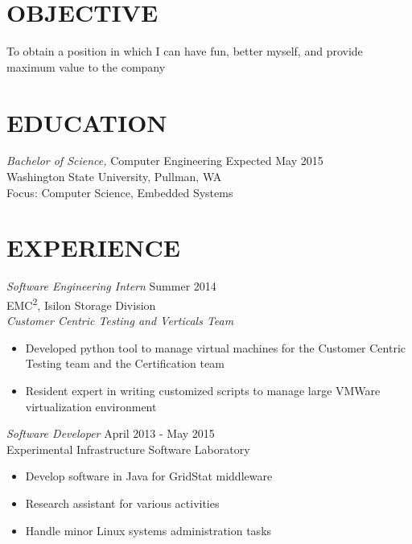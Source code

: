 \documentclass[line, margin]{res}
\begin{document}
\address{1455 NE Brandi Way Apt H203, Pullman, WA 99163}
\address{253-508-2725}

 
\begin{resume}
 
\section{OBJECTIVE}  To obtain a position in which I can have fun, better
				myself, and provide maximum value to the company 
 
\section{EDUCATION} {\sl Bachelor of Science,} Computer Engineering \hfill Expected May 2015 \\
                Washington State University, Pullman, WA\\
                Focus: Computer Science, Embedded Systems
 
\section{EXPERIENCE} {\sl Software Engineering Intern} \hfill Summer 2014 \\
                EMC\textsuperscript{2}, Isilon Storage Division\\
                {\sl Customer Centric Testing and Verticals Team}
                 \begin{itemize}  \itemsep -2pt %
                 \item Developed python tool to manage virtual machines for the
                 Customer Centric Testing team and the Certification team
                \item Resident expert in writing customized scripts to manage large VMWare 
                virtualization environment
                \end{itemize}

                {\sl Software Developer} \hfill       April 2013 - May 2015 \\
                Experimental Infrastructure Software Laboratory
            \begin{itemize} \itemsep -2pt
                    \item Develop software in Java for GridStat middleware
                    \item Research assistant for various activities
                    \item Handle minor Linux systems administration tasks
                \end{itemize}
 

\end{resume}
\end{document}

